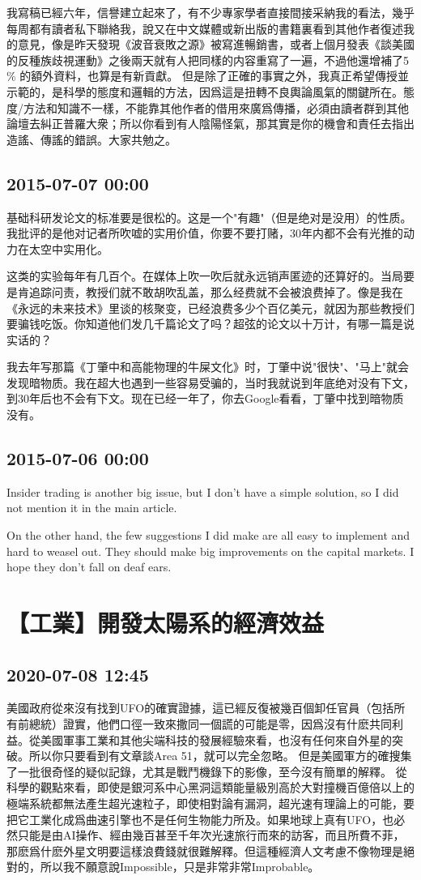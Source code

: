 \documentclass[twocolumn]{ctexart}
\begin{document}
我寫稿已經六年，信譽建立起來了，有不少專家學者直接間接采納我的看法，幾乎每周都有讀者私下聯絡我，說又在中文媒體或新出版的書籍裏看到其他作者復述我的意見，像是昨天發現《波音衰敗之源》被寫進暢銷書，或者上個月發表《談美國的反種族歧視運動》之後兩天就有人把同樣的内容重寫了一遍，不過他還增補了5 \% 的額外資料，也算是有新貢獻。
但是除了正確的事實之外，我真正希望傳授並示範的，是科學的態度和邏輯的方法，因爲這是扭轉不良輿論風氣的關鍵所在。態度/方法和知識不一樣，不能靠其他作者的借用來廣爲傳播，必須由讀者群到其他論壇去糾正普羅大衆；所以你看到有人陰陽怪氣，那其實是你的機會和責任去指出造謠、傳謠的錯誤。大家共勉之。
\subsection*{2015-07-07 00:00}
基础科研发论文的标准要是很松的。这是一个"有趣"（但是绝对是没用）的性质。我批评的是他对记者所吹嘘的实用价值，你要不要打赌，30年内都不会有光推的动力在太空中实用化。

这类的实验每年有几百个。在媒体上吹一吹后就永远销声匿迹的还算好的。当局要是肯追踪问责，教授们就不敢胡吹乱盖，那么经费就不会被浪费掉了。像是我在《永远的未来技术》里谈的核聚变，已经浪费多少个百亿美元，就因为那些教授们要骗钱吃饭。你知道他们发几千篇论文了吗？超弦的论文以十万计，有哪一篇是说实话的？

我去年写那篇《丁肇中和高能物理的牛屎文化》时，丁肇中说"很快"、"马上"就会发现暗物质。我在超大也遇到一些容易受骗的，当时我就说到年底绝对没有下文，到30年后也不会有下文。现在已经一年了，你去Google看看，丁肇中找到暗物质没有。\subsection*{2015-07-06 00:00}
Insider trading is another big issue, but I don't have a simple solution, so I did not mention it in the main article.

On the other hand, the few suggestions I did make are all easy to implement and hard to weasel out. They should make big improvements on the capital markets. I hope they don't fall on deaf ears.\section*{【工業】開發太陽系的經濟效益}
\subsection*{2020-07-08 12:45}

美國政府從來沒有找到UFO的確實證據，這已經反復被幾百個卸任官員（包括所有前總統）證實，他們口徑一致來撒同一個謊的可能是零，因爲沒有什麽共同利益。從美國軍事工業和其他尖端科技的發展經驗來看，也沒有任何來自外星的突破。所以你只要看到有文章談Area 51，就可以完全忽略。
但是美國軍方的確搜集了一批很奇怪的疑似記錄，尤其是戰鬥機錄下的影像，至今沒有簡單的解釋。
從科學的觀點來看，即使是銀河系中心黑洞這類能量級別高於大對撞機百億倍以上的極端系統都無法產生超光速粒子，即使相對論有漏洞，超光速有理論上的可能，要把它工業化成爲曲速引擎也不是任何生物能力所及。如果地球上真有UFO，也必然只能是由AI操作、經由幾百甚至千年次光速旅行而來的訪客，而且所費不菲，那麽爲什麽外星文明要這樣浪費錢就很難解釋。但這種經濟人文考慮不像物理是絕對的，所以我不願意說Impossible，只是非常非常Improbable。
\end{document}
